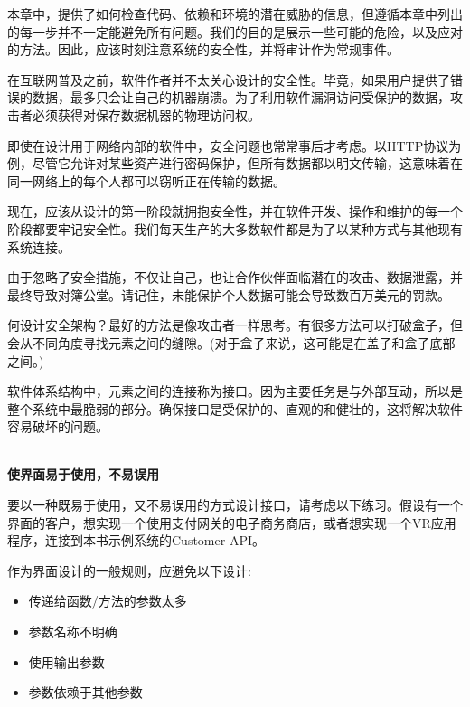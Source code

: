
本章中，提供了如何检查代码、依赖和环境的潜在威胁的信息，但遵循本章中列出的每一步并不一定能避免所有问题。我们的目的是展示一些可能的危险，以及应对的方法。因此，应该时刻注意系统的安全性，并将审计作为常规事件。

在互联网普及之前，软件作者并不太关心设计的安全性。毕竟，如果用户提供了错误的数据，最多只会让自己的机器崩溃。为了利用软件漏洞访问受保护的数据，攻击者必须获得对保存数据机器的物理访问权。

即使在设计用于网络内部的软件中，安全问题也常常事后才考虑。以HTTP协议为例，尽管它允许对某些资产进行密码保护，但所有数据都以明文传输，这意味着在同一网络上的每个人都可以窃听正在传输的数据。

现在，应该从设计的第一阶段就拥抱安全性，并在软件开发、操作和维护的每一个阶段都要牢记安全性。我们每天生产的大多数软件都是为了以某种方式与其他现有系统连接。

由于忽略了安全措施，不仅让自己，也让合作伙伴面临潜在的攻击、数据泄露，并最终导致对簿公堂。请记住，未能保护个人数据可能会导致数百万美元的罚款。


何设计安全架构？最好的方法是像攻击者一样思考。有很多方法可以打破盒子，但会从不同角度寻找元素之间的缝隙。(对于盒子来说，这可能是在盖子和盒子底部之间。)

软件体系结构中，元素之间的连接称为接口。因为主要任务是与外部互动，所以是整个系统中最脆弱的部分。确保接口是受保护的、直观的和健壮的，这将解决软件容易破坏的问题。

\hspace*{\fill} \\ %
\noindent
\textbf{使界面易于使用，不易误用}

要以一种既易于使用，又不易误用的方式设计接口，请考虑以下练习。假设有一个界面的客户，想实现一个使用支付网关的电子商务商店，或者想实现一个VR应用程序，连接到本书示例系统的Customer API。

作为界面设计的一般规则，应避免以下设计:

\begin{itemize}
\item 
传递给函数/方法的参数太多

\item 
参数名称不明确

\item 
使用输出参数

\item 
参数依赖于其他参数
\end{itemize}

